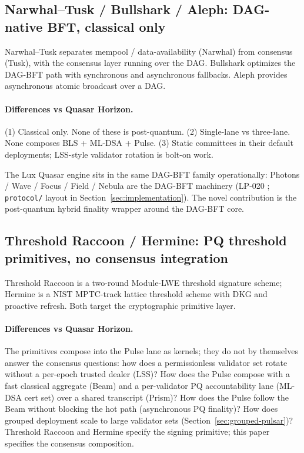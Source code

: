 \subsection{Narwhal--Tusk / Bullshark / Aleph: DAG-native BFT, classical only}

Narwhal--Tusk \cite{narwhal} separates mempool / data-availability (Narwhal) from consensus (Tusk), with the consensus layer running over the DAG. Bullshark \cite{bullshark} optimizes the DAG-BFT path with synchronous and asynchronous fallbacks. Aleph \cite{aleph} provides asynchronous atomic broadcast over a DAG.

\paragraph{Differences vs Quasar Horizon.} (1) Classical only. None of these is post-quantum. (2) Single-lane vs three-lane. None composes BLS + ML-DSA + Pulse. (3) Static committees in their default deployments; LSS-style validator rotation is bolt-on work.

The Lux Quasar engine sits in the same DAG-BFT family operationally: Photons / Wave / Focus / Field / Nebula are the DAG-BFT machinery (LP-020 \cite{lp020}; \texttt{protocol/} layout in Section~\ref{sec:implementation}). The novel contribution is the post-quantum hybrid finality wrapper around the DAG-BFT core.

\subsection{Threshold Raccoon / Hermine: PQ threshold primitives, no consensus integration}

Threshold Raccoon \cite{thresholdraccoon} is a two-round Module-LWE threshold signature scheme; Hermine \cite{hermine} is a NIST MPTC-track lattice threshold scheme with DKG and proactive refresh. Both target the cryptographic primitive layer.

\paragraph{Differences vs Quasar Horizon.} The primitives compose into the Pulse lane as kernels; they do not by themselves answer the consensus questions: how does a permissionless validator set rotate without a per-epoch trusted dealer (LSS)? How does the Pulse compose with a fast classical aggregate (Beam) and a per-validator PQ accountability lane (ML-DSA cert set) over a shared transcript (Prism)? How does the Pulse follow the Beam without blocking the hot path (asynchronous PQ finality)? How does grouped deployment scale to large validator sets (Section~\ref{sec:grouped-pulsar})? Threshold Raccoon and Hermine specify the signing primitive; this paper specifies the consensus composition.

